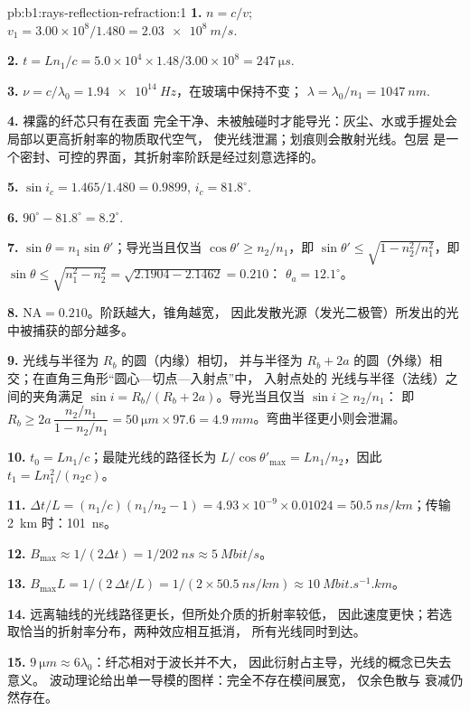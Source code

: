 \begin{solution}{pb:b1:rays-reflection-refraction:1}
\textbf{1.} $n = c/v$; $v_1 = 3.00\times10^8/1.480 = \qty{2.03e8}{m/s}$.

\textbf{2.} $t = Ln_1/c = 5.0\times10^4 \times 1.48/3.00\times10^8 =
\qty{247}{\micro s}$.

\textbf{3.} $\nu = c/\lambda_0 = \qty{1.94e14}{Hz}$，在玻璃中保持不变；
$\lambda = \lambda_0/n_1 = \qty{1047}{nm}$.

\textbf{4.} 裸露的纤芯只有在表面
完全干净、未被触碰时才能导光：灰尘、水或手握处会局部以更高折射率的物质取代空气，
使光线泄漏；划痕则会散射光线。包层
是一个密封、可控的界面，其折射率阶跃是经过刻意选择的。

\textbf{5.} $\sin i_c = 1.465/1.480 = 0.9899$, $i_c = 81.8^\circ$.

\textbf{6.} $90^\circ - 81.8^\circ = 8.2^\circ$.

\textbf{7.} $\sin\theta = n_1\sin\theta'$；导光当且仅当 $\cos\theta' \geq
n_2/n_1$，即 $\sin\theta' \leq \sqrt{1 - n_2^2/n_1^2}$，即
$\sin\theta \leq \sqrt{n_1^2 - n_2^2} = \sqrt{2.1904 - 2.1462} = 0.210$：
$\theta_a = 12.1^\circ$。

\textbf{8.} $\mathrm{NA} = 0.210$。阶跃越大，锥角越宽，
因此发散光源（发光二极管）所发出的光中被捕获的部分越多。

\textbf{9.} 光线与半径为 $R_b$ 的圆（内缘）相切，
并与半径为 $R_b + 2a$ 的圆（外缘）相交；在直角三角形“圆心—切点—入射点”中，
入射点处的
光线与半径（法线）之间的夹角满足
$\sin i = R_b/(R_b + 2a)$。导光当且仅当 $\sin i \geq n_2/n_1$：
即 $R_b \geq 2a\,\dfrac{n_2/n_1}{1 - n_2/n_1} = \qty{50}{\micro m} \times 97.6
= \qty{4.9}{mm}$。弯曲半径更小则会泄漏。

\textbf{10.} $t_0 = Ln_1/c$；最陡光线的路径长为 $L/\cos\theta'_{\max} =
Ln_1/n_2$，因此 $t_1 = Ln_1^2/(n_2 c)$。

\textbf{11.} $\Delta t/L = (n_1/c)(n_1/n_2 - 1) = 4.93\times10^{-9} \times
0.01024 = \qty{50.5}{ns/km}$；传输 \qty{2}{km} 时：\qty{101}{ns}。

\textbf{12.} $B_{\max} \approx 1/(2\Delta t) = 1/\qty{202}{ns} \approx
\qty{5}{Mbit/s}$。

\textbf{13.} $B_{\max} L = 1/(2\,\Delta t/L) = 1/(2 \times
\qty{50.5}{ns/km}) \approx \qty{10}{Mbit.s^{-1}.km}$。

\textbf{14.} 远离轴线的光线路径更长，但所处介质的折射率较低，
因此速度更快；若选取恰当的折射率分布，两种效应相互抵消，
所有光线同时到达。

\textbf{15.} $\qty{9}{\micro m} \approx 6\lambda_0$：纤芯相对于波长并不大，
因此衍射占主导，光线的概念已失去意义。
波动理论给出单一导模的图样：完全不存在模间展宽，
仅余色散与
衰减仍然存在。


\end{solution}
